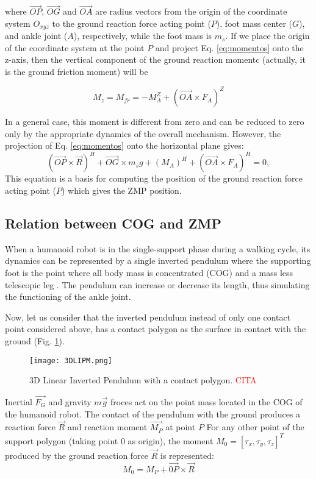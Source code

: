 where $\overrightarrow{OP}$, $\overrightarrow{OG}$ and $\overrightarrow{OA}$ are radius vectors from the origin of the coordinate system $O_{xyz}$ to the ground reaction force acting point ($P$), foot mass center ($G$), and ankle joint ($A$), respectively, while the foot mass is $m_s$. If we place the origin of the coordinate system at the point $P$ and project Eq. \ref{eq:momentos} onto the z-axis, then the vertical component of the ground reaction momentc (actually, it is the ground friction moment) will be

\begin{equation}
M_z = M_{fr} = -M_A^Z + (\overrightarrow{OA} \times F_A)^Z
\end{equation}

In a general case, this moment is different from zero and can be reduced to zero only by the appropriate dynamics of the overall mechanism. However, the projection of Eq. \ref{eq:momentos} onto the horizontal plane gives:
\begin{equation}
(\overrightarrow{OP} \times \overrightarrow{R})^H + \overrightarrow{OG} \times m_sg + (M_A)^H + (\overrightarrow{OA} \times F_A)^H = 0,
\label{eq:momentos}
\end{equation}
This equation is a basis for computing the position of the ground reaction force acting point ($P$) which gives the ZMP position.


\subsection{Relation between COG and ZMP}
When a humanoid robot is in the single-support phase during a walking cycle, its dynamics can be represented by a single inverted pendulum where the supporting foot is the point where all body mass is concentrated (COG) and a mass less telescopic leg \cite{Kaj_2001}. The pendulum can increase or decrease its length, thus simulating the functioning of the ankle joint.

Now, let us consider that the inverted pendulum instead of only one contact point considered above, has a contact polygon as the surface in contact with the ground (Fig. \ref{fig:3DLIPM}).

\begin{figure}[!hbt]
\centering
\texttt{[image: 3DLIPM.png]}
\caption{3D Linear Inverted Pendulum with a contact polygon. \textcolor{red}{CITA}}
\label{fig:3DLIPM}
\end{figure}

Inertial $\overrightarrow{F_G}$ and gravity $m\overrightarrow{g}$ froces act on the point mass located in the COG of the humanoid robot. The contact of the pendulum with the ground produces a reaction force $\overrightarrow{R}$ and reaction moment $\overrightarrow{M_P}$ at point $P$ For any other point of the support polygon (taking point 0 as origin), the moment $M_0=[\tau_x, \tau_y, \tau_z]^T$ produced by the ground reaction force $\overrightarrow{R}$ is represented: 
\begin{equation}
M_0 = M_P + \overrightarrow{0P} \times \overrightarrow{R}
\label{eq:M0}
\end{equation}

